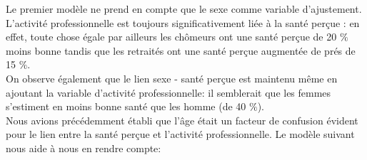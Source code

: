 \documentclass{book}
\begin{document}
\noindent
Le premier modèle ne prend en compte que le sexe comme variable d'ajustement. L'activité professionnelle est toujours significativement liée à la santé perçue : en effet, toute chose égale par ailleurs les chômeurs ont une santé perçue de 20 $\%$ moins bonne tandis que les retraités ont une santé perçue augmentée de prés de 15 $\%$.\\
On observe également que le lien sexe - santé perçue est maintenu même en ajoutant la variable d'activité professionnelle: il semblerait que les femmes s'estiment en moins bonne santé que les homme (de 40 $\%$).\\

\bigskip
\newpage
\noindent
Nous avions précédemment établi que l'âge était un facteur de confusion évident pour le lien entre la santé perçue et l'activité professionnelle. Le modèle suivant nous aide à nous en rendre compte:\\
\end{document}
